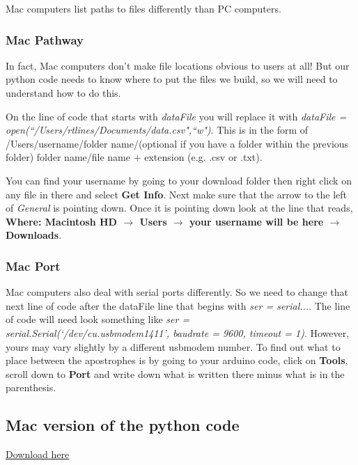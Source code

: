 Mac computers list paths to files differently than PC computers.

\subsubsection{Mac Pathway}

In fact, Mac computers don't make file locations obvious to users at all! But our python code needs to know where to put the files we build, so we will need to understand how to do this.

On the line of code that starts with \textit{dataFile} you will replace it with \textit{dataFile = open(\textquotedblleft /Users/rtlines/Documents/data.csv",\textquotedblleft w")}. This is in the form of /Users/username/folder name/(optional if you have a folder within
the previous folder) folder name/file name + extension (e.g. .csv or .txt).

You can find your username by going to your download folder then right click on any file in there and select \textbf{Get Info}. Next make sure that the arrow to the left of \textit{General} is pointing down. Once it is pointing down look at the line that reads, \textbf{Where: Macintosh HD $\rightarrow $ Users $\rightarrow $ your username will be here $\rightarrow $ Downloads}.

\subsubsection{Mac Port}

Mac computers also deal with serial ports differently. So we need to change that next line of code after the dataFile line that begins with \textit{ser = serial...}. The line of code will need look something like \textit{ser = serial.Serial(`/dev/cu.usbmodem1411', baudrate = 9600, timeout = 1)}. However, yours may vary slightly by a different usbmodem number. To find out what to place between the apostrophes is by going to your arduino code, click on \textbf{Tools}, scroll down to \textbf{Port} and write down what is written there minus what is in the parenthesis.

\subsection{Mac version of the python code}

\href{https://raw.githubusercontent.com/rtlines/IntermediateLabPH250/main/Code/Data2Computer_PythonSide_Mac.py}{Download here}


